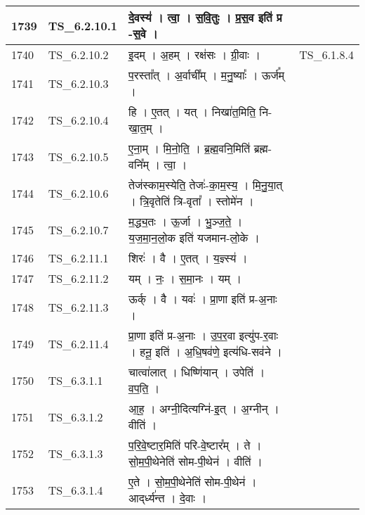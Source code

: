 \documentclass[17pt]{extarticle}
\begin{document}
\begin{longtable}{||p{0.4in}||p{0.9in}||p{4.0in}||p{0.9in}||}
        \hline
            1739 & TS\_6.2.10.1 & दे॒वस्य॑   ।   त्वा॒   ।   स॒वि॒तुः   ।   प्र॒स॒व इति॑ प्र {-}स॒वे   ।    &      \\
        \hline
            1740 & TS\_6.2.10.2 & इ॒दम्   ।   अ॒हम्   ।   रक्ष॑सः   ।   ग्री॒वाः   ।    & TS\_6.1.8.4        \\
        \hline
            1741 & TS\_6.2.10.3 & प॒रस्ता᳚त्   ।   अ॒र्वाची᳚म्   ।   म॒नु॒ष्याः᳚   ।   ऊर्ज᳚म्   ।    &      \\
        \hline
            1742 & TS\_6.2.10.4 & हि   ।   ए॒तत्   ।   यत्   ।   निखा॑त॒मिति॒ नि{-}खा॒त॒म्   ।    &      \\
        \hline
            1743 & TS\_6.2.10.5 & ए॒ना॒म्   ।   मि॒नो॒ति॒   ।   ब्र॒ह्म॒वनि॒मिति॑ ब्रह्म{-}वनि᳚म्   ।   त्वा॒   ।    &      \\
        \hline
            1744 & TS\_6.2.10.6 & तेज॑स्काम॒स्येति॒ तेजः॑{-}का॒म॒स्य॒   ।   मि॒नु॒या॒त्   ।   त्रि॒वृतेति॑ त्रि{-}वृता᳚   ।   स्तोमे॑न   ।    &      \\
        \hline
            1745 & TS\_6.2.10.7 & म॒द्ध्य॒तः   ।   ऊ॒र्जा   ।   भु॒ञ्ज॒ते॒   ।   य॒ज॒मा॒न॒लो॒क इति॑ यजमान{-}लो॒के   ।    &      \\
        \hline
            1746 & TS\_6.2.11.1 & शिरः॑   ।   वै   ।   ए॒तत्   ।   य॒ज्ञ्स्य॑   ।    &      \\
        \hline
            1747 & TS\_6.2.11.2 & यम्   ।   नः॒   ।   स॒मा॒नः   ।   यम्   ।    &      \\
        \hline
            1748 & TS\_6.2.11.3 & ऊर्क्   ।   वै   ।   यवः॑   ।   प्रा॒णा इति॑ प्र{-}अ॒नाः   ।    &      \\
        \hline
            1749 & TS\_6.2.11.4 & प्रा॒णा इति॑ प्र{-}अ॒नाः   ।   उ॒प॒र॒वा इत्यु॑प{-}र॒वाः   ।   हनू॒ इति॑   ।   अ॒धि॒षव॑णे॒ इत्य॑धि{-}सव॑ने   ।    &      \\
        \hline
            1750 & TS\_6.3.1.1 & चात्वा॑लात्   ।   धिष्णि॑यान्   ।   उपेति॑   ।   व॒प॒ति॒   ।    &      \\
        \hline
            1751 & TS\_6.3.1.2 & आ॒ह॒   ।   अग्नी॒दित्यग्नि॑{-}इ॒त्   ।   अ॒ग्नीन्   ।   वीति॑   ।    &      \\
        \hline
            1752 & TS\_6.3.1.3 & प॒रि॒वे॒ष्टार॒मिति॑ परि{-}वे॒ष्टार᳚म्   ।   ते   ।   सो॒म॒पी॒थेनेति॑ सोम{-}पी॒थेन॑   ।   वीति॑   ।    &      \\
        \hline
            1753 & TS\_6.3.1.4 & ए॒ते   ।   सो॒म॒पी॒थेनेति॑ सोम{-}पी॒थेन॑   ।   आद्‌र्ध्य॑न्त   ।   दे॒वाः   ।    &      \\

\end{longtable}
\end{document}

